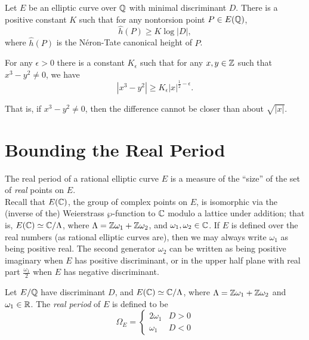 \documentclass[10pt]{article}
\begin{document}
\begin{conjecture}[Lang]\label{conj:Lang}
Let $E$ be an elliptic curve over $\mathbb{Q}$ with minimal discriminant $D$. There is a positive constant $K$ such that for any nontorsion point $P\in E(\mathbb{Q})$,
\begin{equation}
\hat{h}(P) \ge K\log |D|,
\end{equation}
where $\hat{h}(P)$ is the N\'{e}ron-Tate canonical height of $P$.
\end{conjecture}

\begin{conjecture}[Hall]\label{conj:Hall}
For any $\epsilon > 0$ there is a constant $K_{\epsilon}$ such that for any $x,y \in \mathbb{Z}$ such that $x^3-y^2 \ne 0$, we have
\begin{equation}
|x^3-y^2| \ge K_{\epsilon} |x|^{\frac{1}{2}-\epsilon}.
\end{equation}
\end{conjecture}
That is, if $x^3-y^2 \ne 0$, then the difference cannot be closer than about $\sqrt{|x|}$.

\newpage
\section{Bounding the Real Period}

The real period of a rational elliptic curve $E$ is a measure of the ``size'' of the set of {\it real} points on $E$. \\

Recall that $E(\mathbb{C})$, the group of complex points on $E$, is isomorphic via the (inverse of the) Weierstrass $\wp$-function to $\mathbb{C}$ modulo a lattice under addition; that is, $E(\mathbb{C}) \simeq \mathbb{C}/\Lambda$, where $\Lambda = \mathbb{Z}\omega_1 + \mathbb{Z}\omega_2$, and $\omega_1,\omega_2 \in \mathbb{C}$.
If $E$ is defined over the real numbers (as rational elliptic curves are), then we may always write $\omega_1$ as being positive real. The second generator $\omega_2$ can be written as being positive imaginary when $E$ has positive discriminant, or in the upper half plane with real part $\frac{\omega_1}{2}$ when $E$ has negative discriminant.

\begin{definition}
Let $E/\mathbb{Q}$ have discriminant $D$, and $E(\mathbb{C}) \simeq \mathbb{C}/\Lambda$, where $\Lambda = \mathbb{Z}\omega_1 + \mathbb{Z}\omega_2$ and $\omega_1 \in \mathbb{R}$. The {\it real period} of $E$ is defined to be
\begin{equation}
\Omega_E = \begin{cases} 2\omega_1 & D > 0 \\ \omega_1 & D < 0 \end{cases}
\end{equation}
\end{definition}
\end{document}

